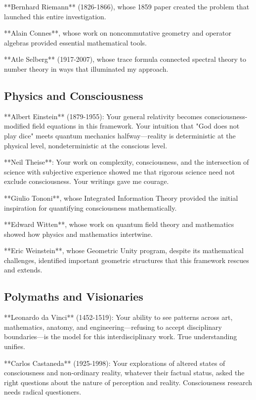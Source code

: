 **Bernhard Riemann** (1826-1866), whose 1859 paper created the problem that launched this entire investigation.

**Alain Connes**, whose work on noncommutative geometry and operator algebras provided essential mathematical tools.

**Atle Selberg** (1917-2007), whose trace formula connected spectral theory to number theory in ways that illuminated my approach.

\subsection*{Physics and Consciousness}

**Albert Einstein** (1879-1955): Your general relativity becomes consciousness-modified field equations in this framework. Your intuition that "God does not play dice" meets quantum mechanics halfway—reality is deterministic at the physical level, nondeterministic at the conscious level.

**Neil Theise**: Your work on complexity, consciousness, and the intersection of science with subjective experience showed me that rigorous science need not exclude consciousness. Your writings gave me courage.

**Giulio Tononi**, whose Integrated Information Theory provided the initial inspiration for quantifying consciousness mathematically.

**Edward Witten**, whose work on quantum field theory and mathematics showed how physics and mathematics intertwine.

**Eric Weinstein**, whose Geometric Unity program, despite its mathematical challenges, identified important geometric structures that this framework rescues and extends.

\subsection*{Polymaths and Visionaries}

**Leonardo da Vinci** (1452-1519): Your ability to see patterns across art, mathematics, anatomy, and engineering—refusing to accept disciplinary boundaries—is the model for this interdisciplinary work. True understanding unifies.

**Carlos Castaneda** (1925-1998): Your explorations of altered states of consciousness and non-ordinary reality, whatever their factual status, asked the right questions about the nature of perception and reality. Consciousness research needs radical questioners.

